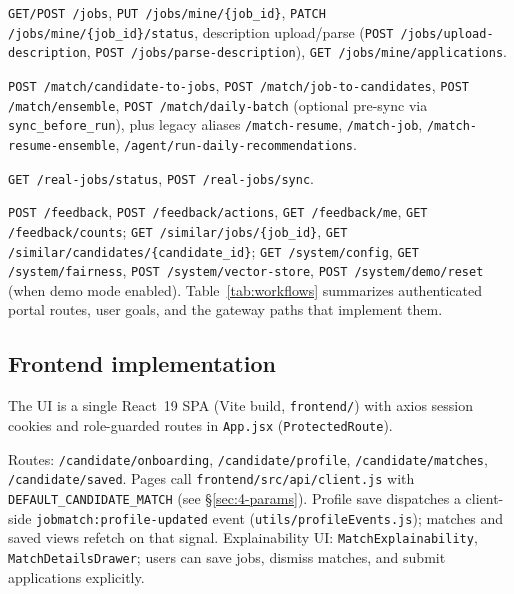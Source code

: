 \texttt{GET/POST /jobs}, \texttt{PUT /jobs/mine/\{job\_id\}}, \texttt{PATCH /jobs/mine/\{job\_id\}/status}, description upload/parse (\texttt{POST /jobs/upload-description}, \texttt{POST /jobs/parse-description}), \texttt{GET /jobs/mine/applications}.

\texttt{POST /match/candidate-to-jobs}, \texttt{POST /match/job-to-candidates}, \texttt{POST /match/ensemble}, \texttt{POST /match/daily-batch} (optional pre-sync via \texttt{sync\_before\_run}), plus legacy aliases \texttt{/match-resume}, \texttt{/match-job}, \texttt{/match-resume-ensemble}, \texttt{/agent/run-daily-recommendations}.

\texttt{GET /real-jobs/status}, \texttt{POST /real-jobs/sync}.

\texttt{POST /feedback}, \texttt{POST /feedback/actions}, \texttt{GET /feedback/me}, \texttt{GET /feedback/counts};
\texttt{GET /similar/jobs/\{job\_id\}}, \texttt{GET /similar/candidates/\{candidate\_id\}};
\texttt{GET /system/config}, \texttt{GET /system/fairness}, \texttt{POST /system/vector-store}, \texttt{POST /system/demo/reset} (when demo mode enabled).
Table~\ref{tab:workflows} summarizes authenticated portal routes, user goals, and the gateway paths that implement them.

\begin{JTable}

\end{JTable}

\subsection{Frontend implementation}\label{sec:4-frontend}

The UI is a single React~19 SPA (Vite build, \texttt{frontend/}) with axios session cookies and role-guarded routes in \texttt{App.jsx} (\texttt{ProtectedRoute}).

Routes: \texttt{/candidate/onboarding}, \texttt{/candidate/profile}, \texttt{/candidate/matches}, \texttt{/candidate/saved}.
Pages call \texttt{frontend/src/api/client.js} with \texttt{DEFAULT\_CANDIDATE\_MATCH} (see \S\ref{sec:4-params}).
Profile save dispatches a client-side \texttt{jobmatch:profile-updated} event (\texttt{utils/profileEvents.js}); matches and saved views refetch on that signal.
Explainability UI: \texttt{MatchExplainability}, \texttt{MatchDetailsDrawer}; users can save jobs, dismiss matches, and submit applications explicitly.

